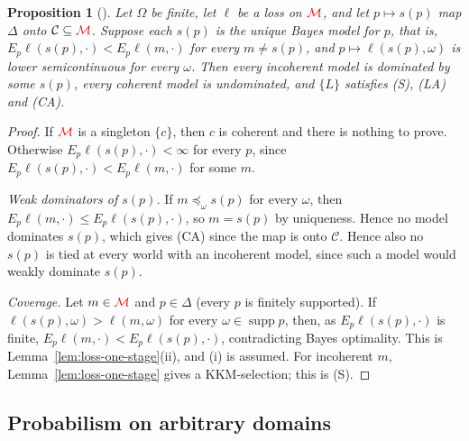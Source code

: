 \documentclass[11pt]{article}
\newcommand{\chg}[1]{{\color{red}#1}}
\newtheorem{proposition}[theorem]{Proposition}
\theoremstyle{definition}
\theoremstyle{remark}
\newcommand{\M}{\mathcal M}
\newcommand{\C}{\mathcal C}
\newcommand{\supp}{\operatorname{supp}}
\begin{document}
\begin{proposition}[{\cite{Predd2009,Pettigrew2022}}]\label{prop:proper}
Let $\Omega$ be finite, let $\ell$ be a loss on $\chg{\M}$, and let $p\mapsto s(p)$ map $\Delta$ onto $\C\subseteq\chg{\M}$. Suppose each $s(p)$ is the unique Bayes model for $p$, that is, $E_p\ell(s(p),\cdot)<E_p\ell(m,\cdot)$ for every $m\ne s(p)$, and $p\mapsto\ell(s(p),\omega)$ is lower semicontinuous for every $\omega$. Then every incoherent model is dominated by some $s(p)$, every coherent model is undominated, and $\{L\}$ satisfies \chg{(S), (LA) and (CA)}.
\end{proposition}
\begin{proof}
If $\chg{\M}$ is a singleton $\{c\}$, then $c$ is coherent and there is nothing to prove. Otherwise $E_p\ell(s(p),\cdot)<\infty$ for every $p$, since $E_p\ell(s(p),\cdot)<E_p\ell(m,\cdot)$ for some $m$.

\emph{Weak dominators of $s(p)$.} If $m\preceq_\omega s(p)$ for every $\omega$, then $E_p\ell(m,\cdot)\le E_p\ell(s(p),\cdot)$, so $m=s(p)$ by uniqueness. Hence no model dominates $s(p)$, which gives \chg{(CA)} since the map is onto $\C$. Hence also no $s(p)$ is tied at every world with an incoherent model, since such a model would weakly dominate $s(p)$.

\emph{Coverage.} Let $m\in\chg{\M}$ and $p\in\Delta$ (every $p$ is finitely supported). If $\ell(s(p),\omega)>\ell(m,\omega)$ for every $\omega\in\supp p$, then, as $E_p\ell(s(p),\cdot)$ is finite, $E_p\ell(m,\cdot)<E_p\ell(s(p),\cdot)$, contradicting Bayes optimality. This is Lemma~\ref{lem:loss-one-stage}(ii), and (i) is assumed. For incoherent $m$, Lemma~\ref{lem:loss-one-stage} gives a KKM-selection; this is \chg{(S)}.
\end{proof}

\subsection{Probabilism on arbitrary domains}\label{sec:probabilism}
\end{document}
